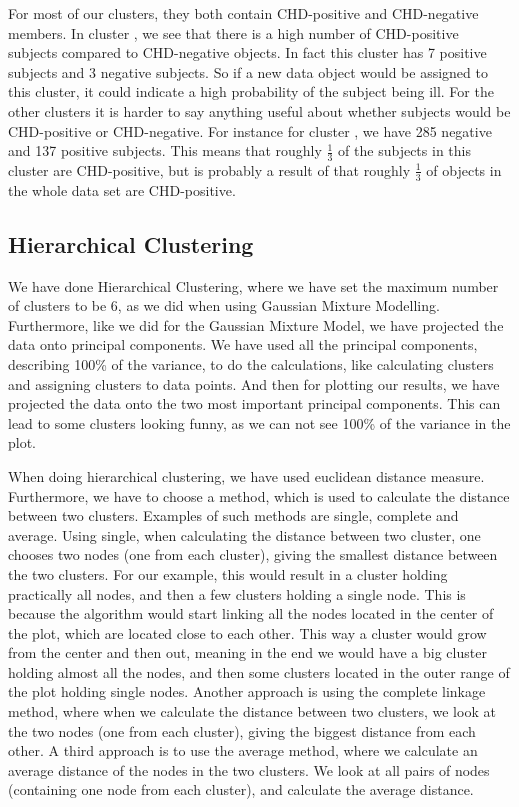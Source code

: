 For most of our clusters, they both contain CHD-positive and CHD-negative members. In cluster \CN, we see that there is a high number of CHD-positive subjects compared to CHD-negative objects. In fact this cluster has 7 positive subjects and 3 negative subjects. So if a new data object would be assigned to this cluster, it could indicate a high probability of the subject being ill. For the other clusters it is harder to say anything useful about whether subjects would be CHD-positive or CHD-negative. For instance for cluster \MDC, we have 285 negative and 137 positive subjects. This means that roughly $\frac{1}{3}$ of the subjects in this cluster are CHD-positive, but is probably a result of that roughly $\frac{1}{3}$ of objects in the whole data set are CHD-positive.


\subsection{Hierarchical Clustering}

We have done Hierarchical Clustering, where we have set the maximum number of clusters to be 6, as we did when using Gaussian Mixture Modelling. Furthermore, like we did for the Gaussian Mixture Model, we have projected the data onto principal components. We have used all the principal components, describing 100\% of the variance, to do the calculations, like calculating clusters and assigning clusters to data points. And then for plotting our results, we have projected the data onto the two most important principal components. This can lead to some clusters looking funny, as we can not see 100\% of the variance in the plot.

When doing hierarchical clustering, we have used euclidean distance measure. Furthermore, we have to choose a method, which is used to calculate the distance between two clusters. Examples of such methods are single, complete and average. Using single, when calculating the distance between two cluster, one chooses two nodes (one from each cluster), giving the smallest distance between the two clusters. For our example, this would result in a cluster holding practically all nodes, and then a few clusters holding a single node.  This is because the algorithm would start linking all the nodes located in the center of the plot, which are located close to each other. This way a cluster would grow from the center and then out, meaning in the end we would have a big cluster holding almost all the nodes, and then some clusters located in the outer range of the plot holding single nodes. Another approach is using the complete linkage method, where when we calculate the distance between two clusters, we look at the two nodes (one from each cluster), giving the biggest distance from each other. A third approach is to use the average method, where we calculate an average distance of the nodes in the two clusters. We look at all pairs of nodes (containing one node from each cluster), and calculate the average distance.

